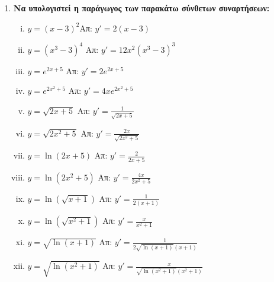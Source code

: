 \documentclass[a4paper,table]{report}
\begin{document}
\begin{enumerate}
  \item {\bfseries Να υπολογιστεί η παράγωγος των παρακάτω σύνθετων συναρτήσεων:}
    \begin{enumerate}[i)]
      \item $ y=(x-3)^2$\hfill Απ: $y'=2(x-3)$
      \item $ y=(x^{3}-3)^{4} $ \hfill Απ: $ y'=12x^{2}(x^{3}-3)^{3} $ 
      \item $ y=e^{2x+5} $ \hfill Απ: $ y'=2 e^{2x+5} $ 
      \item $ y=e^{2x^{2}+5} $ \hfill Απ: $ y'=4xe^{2x^{2}+5} $ 
      \item $ y= \sqrt{2x+5} $ \hfill Απ: $ y'= \frac{1}{\sqrt{2x+5}} $ 
      \item $ y= \sqrt{2x^{2}+5} $ \hfill Απ: $ y'= \frac{2x}{\sqrt{2x^{2}+5}} $ 
      \item $ y= \ln{(2x+5)} $ \hfill Απ: $ y'= \frac{2}{2x+5} $ 
      \item $ y= \ln{(2x^{2}+5)} $ \hfill Απ: $ y'= \frac{4x}{2x^{2}+5} $ 
      \item $ y= \ln{(\sqrt{x+1})} $ \hfill Απ: $ y'= \frac{1}{2(x+1)} $ 
      \item $ y= \ln{(\sqrt{x^{2}+1})} $ \hfill Απ: $ y'= \frac{x}{x^{2}+1} $ 
      \item $ y= \sqrt{\ln{(x+1)}} $ 
      \hfill Απ: $ y'= \frac{1}{2 \sqrt{\ln{(x+1)}}(x+1)} $ 
    \item $ y= \sqrt{\ln{(x^{2}+1)}} $ 
      \hfill Απ: $ y'= \frac{x}{\sqrt{\ln{(x^{2}+1)}}(x^{2}+1)} $ 
    \end{enumerate}
\end{enumerate}
\end{document}
